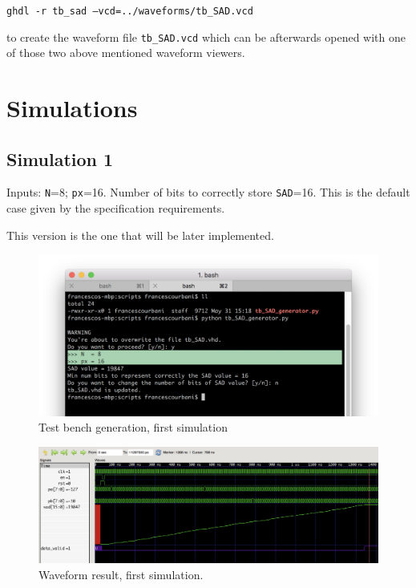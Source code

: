 \documentclass[12pt, a4paper]{article}
\begin{document}
\texttt{ghdl -r tb\_sad --vcd=../waveforms/tb\_SAD.vcd}
\newline

to create the waveform file \texttt{tb\_SAD.vcd} which can be afterwards opened with one of those two above mentioned waveform viewers.





\newpage
\section{Simulations}

\subsection{Simulation 1}

Inputs: \texttt{N}=8; \texttt{px}=16. Number of bits to correctly store \texttt{SAD}=16. This is the default case given by the specification requirements. 

This version is the one that will be later implemented.

\begin{figure}[h!]
\includegraphics[scale=0.5]{../screenshots/gtkwave/sim1_term.png}
\caption{Test bench generation, first simulation}%
\end{figure}


\begin{figure}[h!]
\includegraphics[scale=0.18]{../screenshots/gtkwave/sim1_gtkwave.png}
\caption{Waveform result, first simulation.}\label{fig:wave1}
\end{figure}
\end{document}
